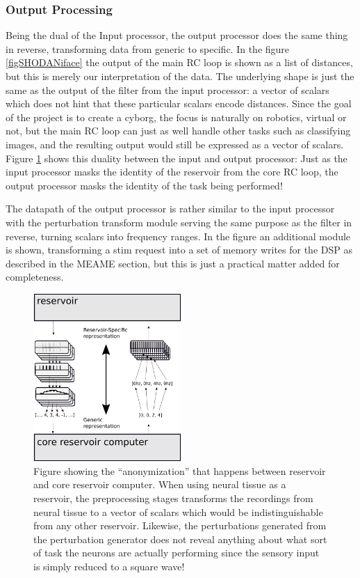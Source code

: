 \subsubsection{Output Processing}
Being the dual of the Input processor, the output processor does the same thing
in reverse, transforming data from generic to specific.
In the figure \ref{figSHODANiface} the output of the main RC loop is shown as a
list of distances, but this is merely our interpretation of the data.
The underlying shape is just the same as the output of the filter from the input
processor: a vector of scalars which does not hint that these particular scalars
encode distances.
Since the goal of the project is to create a cyborg, the focus is naturally on
robotics, virtual or not, but the main RC loop can just as well handle other
tasks such as classifying images, and the resulting output would still be
expressed as a vector of scalars.
Figure \ref{figGenericSpecific} shows this duality between the input and output
processor: Just as the input processor masks the identity of the reservoir from
the core RC loop, the output processor masks the identity of the task being
performed!\par
The datapath of the output processor is rather similar to the input processor
with the perturbation transform module serving the same purpose as the filter in
reverse, turning scalars into frequency ranges.
In the figure an additional module is shown, transforming a stim request into a
set of memory writes for the DSP as described in the MEAME section, but this is
just a practical matter added for completeness.
\begin{figure}[h!]
  \centering
  \includegraphics[width=0.5\textwidth]{fig/genericSpecific.png}
  \caption{
    Figure showing the ``anonymization'' that happens between reservoir and core
    reservoir computer.
    When using neural tissue as a reservoir, the preprocessing stages transforms
    the recordings from neural tissue to a vector of scalars which would be
    indistinguishable from any other reservoir.
    Likewise, the perturbations generated from the perturbation generator does
    not reveal anything about what sort of task the neurons are actually
    performing since the sensory input is simply reduced to a square wave!
  }
  \label{figGenericSpecific}
\end{figure}
